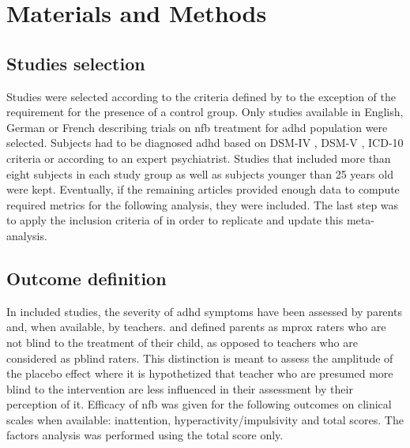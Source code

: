 

\section{Materials and Methods}

\subsection{Studies selection}

Studies were selected according to the criteria defined by \citet{Cortese2016} to the exception of the requirement for the presence of a control group. 
Only studies available in English, German or French describing trials on \gls{nfb} treatment for \gls{adhd} 
population were selected. Subjects had to be diagnosed \gls{adhd} based on DSM-IV \citep{DSM-4}, DSM-V \citep{DSM-5}, ICD-10 \citep{ICD101993} criteria or according to an expert psychiatrist. Studies that included more than eight subjects in each study group as well as subjects younger than 25 years old were kept. Eventually, if the remaining articles provided enough data to compute required metrics for the following analysis, they were included. The last step was to apply the inclusion criteria of \citet{Cortese2016} in order to replicate and update this meta-analysis.  

\subsection{Outcome definition} 

In included studies, the severity of \gls{adhd} symptoms have been assessed by parents and, when available, by teachers. \citet{Cortese2016} 
and \citet{Micoulaud2014} defined parents as \gls{mprox} raters who are not blind to the treatment of their child, as opposed to 
teachers who are considered as \gls{pblind} raters. This distinction is meant to assess the amplitude of the placebo effect where it is hypothetized that teacher who are presumed more blind to the intervention are less influenced in their assessment by their perception of it. Efficacy of \gls{nfb} was given for the following outcomes on clinical scales when available: inattention, 
hyperactivity/impulsivity and total scores. The factors analysis was performed using the total score only.


